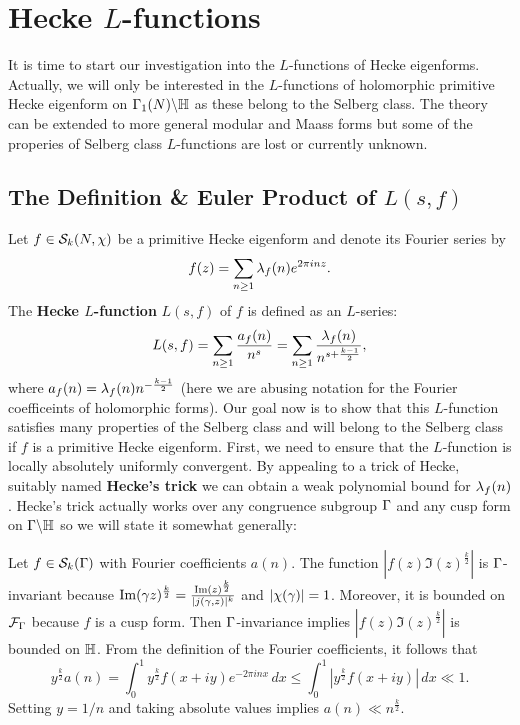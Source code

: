   \section{Hecke \texorpdfstring{$L$}{L}-functions}
    It is time to start our investigation into the $L$-functions of Hecke eigenforms. Actually, we will only be interested in the $L$-functions of holomorphic primitive Hecke eigenform on $\Gamma_{1}(N)\backslash\mathbb{H}$ as these belong to the Selberg class. The theory can be extended to more general modular and Maass forms but some of the properies of Selberg class $L$-functions are lost or currently unknown.
    \subsection*{The Definition \& Euler Product of \texorpdfstring{$L(s,f)$}{L(s,f)}}
      Let $f \in \mathcal{S}_{k}(N,\chi)$ be a primitive Hecke eigenform and denote its Fourier series by
      \[
        f(z) = \sum_{n \ge 1}\lambda_{f}(n)e^{2\pi inz}.
      \]
      The \textbf{Hecke $L$-function} $L(s,f)$ of $f$ is defined as an $L$-series:
      \[
        L(s,f) = \sum_{n \ge 1}\frac{a_{f}(n)}{n^{s}} = \sum_{n \ge 1}\frac{\lambda_{f}(n)}{n^{s+\frac{k-1}{2}}},
      \]
      where $a_{f}(n) = \lambda_{f}(n)n^{-\frac{k-1}{2}}$ (here we are abusing notation for the Fourier coefficeints of holomorphic forms). Our goal now is to show that this $L$-function satisfies many properties of the Selberg class and will belong to the Selberg class if $f$ is a primitive Hecke eigenform. First, we need to ensure that the $L$-function is locally absolutely uniformly convergent. By appealing to a trick of Hecke, suitably named \textbf{Hecke's trick} we can obtain a weak polynomial bound for $\lambda_{f}(n)$. Hecke's trick actually works over any congruence subgroup $\Gamma$ and any cusp form on $\Gamma\backslash\mathbb{H}$ so we will state it somewhat generally:

      \begin{method}
        Let $f \in \mathcal{S}_{k}(\Gamma)$ with Fourier coefficients $a(n)$. The function $\left|f(z)\Im(z)^{\frac{k}{2}}\right|$ is $\Gamma$-invariant because $\mathrm{Im}(\gamma z)^{\frac{k}{2}} = \frac{\mathrm{Im}(z)^{\frac{k}{2}}}{|j(\gamma,z)|^{k}}$ and $|\chi(\gamma)| = 1$. Moreover, it is bounded on $\mathcal{F}_{\Gamma}$ because $f$ is a cusp form. Then $\Gamma$-invariance implies $\left|f(z)\Im(z)^{\frac{k}{2}}\right|$ is bounded on $\mathbb{H}$. From the definition of the Fourier coefficients, it follows that
        \[
          y^{\frac{k}{2}}a(n) = \int_{0}^{1}y^{\frac{k}{2}}f(x+iy)e^{-2\pi inx}\,dx \le \int_{0}^{1}\left|y^{\frac{k}{2}}f(x+iy)\right|\,dx \ll 1.
        \]
        Setting $y = 1/n$ and taking absolute values implies $a(n) \ll n^{\frac{k}{2}}$.
      \end{method}

